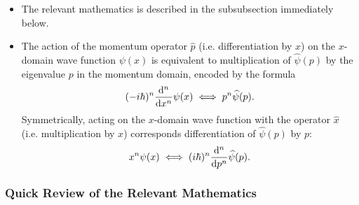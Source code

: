\documentclass[11pt, a4paper]{article}
\newcommand{\F}[1]{\widehat{#1}} %
\begin{document}
\begin{itemize}
    \item The relevant mathematics is described in the subsubsection immediately below.

    \item The action of the momentum operator $ \hat{p} $ (i.e. differentiation by $ x $) on the $ x $-domain wave function $ \psi(x) $ is equivalent to multiplication of $ \F{\psi}(p) $ by the eigenvalue $ p $ in the momentum domain, encoded by the formula
    \begin{equation*}
        (- i \hbar)^{n}\dv[n]{}{x} \psi(x) \iff p^{n} \F{\psi}(p).
    \end{equation*}
    Symmetrically, acting on the $ x $-domain wave function with the operator $ \hat{x} $ (i.e. multiplication by $ x $) corresponds differentiation of $ \F{\psi}(p) $ by $ p $:
    \begin{equation*}
        x^{n}\psi(x) \iff (i \hbar)^{n} \dv[n]{}{p}\F{\psi}(p).
    \end{equation*}

\end{itemize}

\subsubsection{Quick Review of the Relevant Mathematics}
\end{document}

